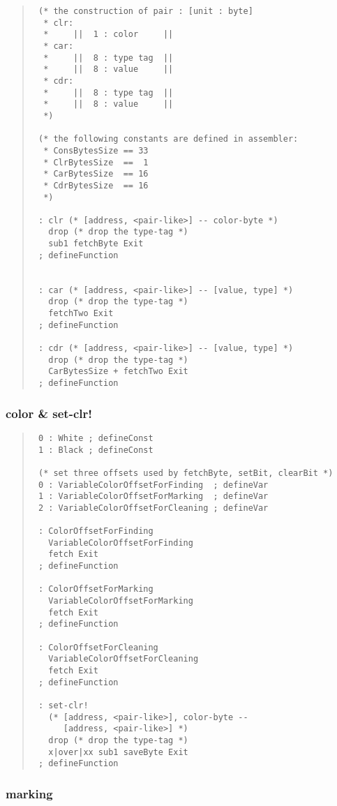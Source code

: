 \documentclass[a4paper]{article}
\begin{document}
\begin{quote}
\begin{verbatim}
 (* the construction of pair : [unit : byte]
  * clr:
  *     ||  1 : color     ||
  * car:
  *     ||  8 : type tag  ||
  *     ||  8 : value     ||
  * cdr:
  *     ||  8 : type tag  ||
  *     ||  8 : value     ||
  *)

 (* the following constants are defined in assembler:
  * ConsBytesSize == 33
  * ClrBytesSize  ==  1
  * CarBytesSize  == 16
  * CdrBytesSize  == 16
  *)

 : clr (* [address, <pair-like>] -- color-byte *)
   drop (* drop the type-tag *)
   sub1 fetchByte Exit
 ; defineFunction


 : car (* [address, <pair-like>] -- [value, type] *)
   drop (* drop the type-tag *)
   fetchTwo Exit
 ; defineFunction

 : cdr (* [address, <pair-like>] -- [value, type] *)
   drop (* drop the type-tag *)
   CarBytesSize + fetchTwo Exit
 ; defineFunction
\end{verbatim}
\end{quote}


\subsubsection{color \& set-clr!}

\begin{quote}
\begin{verbatim}
 0 : White ; defineConst
 1 : Black ; defineConst

 (* set three offsets used by fetchByte, setBit, clearBit *)
 0 : VariableColorOffsetForFinding  ; defineVar
 1 : VariableColorOffsetForMarking  ; defineVar
 2 : VariableColorOffsetForCleaning ; defineVar

 : ColorOffsetForFinding
   VariableColorOffsetForFinding
   fetch Exit
 ; defineFunction

 : ColorOffsetForMarking
   VariableColorOffsetForMarking
   fetch Exit
 ; defineFunction

 : ColorOffsetForCleaning
   VariableColorOffsetForCleaning
   fetch Exit
 ; defineFunction

 : set-clr!
   (* [address, <pair-like>], color-byte --
      [address, <pair-like>] *)
   drop (* drop the type-tag *)
   x|over|xx sub1 saveByte Exit
 ; defineFunction
\end{verbatim}
\end{quote}


\subsubsection{marking}
\end{document}
